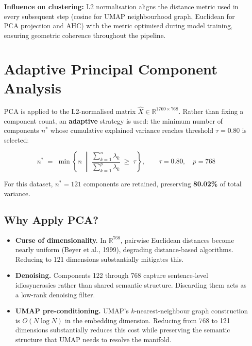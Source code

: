\documentclass[11pt, a4paper]{article}
\begin{document}
\begin{insightbox}
\textbf{Influence on clustering:} L2 normalisation aligns the distance metric
used in every subsequent step (cosine for UMAP neighbourhood graph, Euclidean
for PCA projection and AHC) with the metric optimised during model training,
ensuring geometric coherence throughout the pipeline.
\end{insightbox}

\section{Adaptive Principal Component Analysis}

PCA is applied to the L2-normalised matrix $\hat{X} \in \mathbb{R}^{1760
\times 768}$.  Rather than fixing a component count, an
\textbf{adaptive} strategy is used: the minimum number of components $n^*$
whose cumulative explained variance reaches threshold $\tau = 0.80$ is
selected:

\begin{mathbox}
\[
  n^{*} \;=\; \min\!\left\{n \;\middle|\;
    \frac{\sum_{k=1}^{n} \lambda_k}{\sum_{k=1}^{p} \lambda_k}
    \;\geq\; \tau \right\},
  \qquad \tau = 0.80,\quad p = 768
\]
\end{mathbox}

For this dataset, $n^{*} = 121$ components are retained, preserving
\textbf{80.02\%} of total variance.

\subsection{Why Apply PCA?}

\begin{itemize}
  \item \textbf{Curse of dimensionality.}  In $\mathbb{R}^{768}$, pairwise
        Euclidean distances become nearly uniform (Beyer et al., 1999),
        degrading distance-based algorithms.  Reducing to 121 dimensions
        substantially mitigates this.

  \item \textbf{Denoising.}  Components 122 through 768 capture
        sentence-level idiosyncrasies rather than shared semantic structure.
        Discarding them acts as a low-rank denoising filter.

  \item \textbf{UMAP pre-conditioning.}  UMAP's $k$-nearest-neighbour graph
        construction is $O(N \log N)$ in the embedding dimension.  Reducing
        from 768 to 121 dimensions substantially reduces this cost while
        preserving the semantic structure that UMAP needs to resolve the
        manifold.
\end{itemize}
\end{document}

